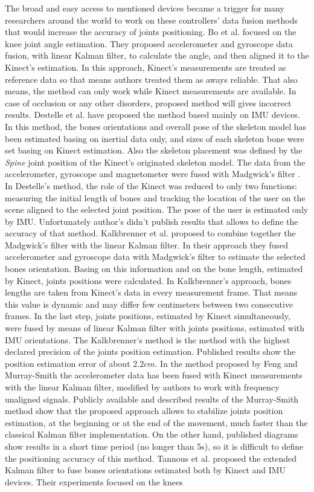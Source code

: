 \documentclass[sensors,article,submit,moreauthors,pdftex,10pt,a4paper]{mdpi}
\begin{document}
The broad and easy access to mentioned devices became a trigger for many researchers around the world to work on these controllers' data fusion methods that would increase the accuracy of joints positioning. Bo et al. \cite{Bo2011a} focused on the knee joint angle estimation. They proposed accelerometer and gyroscope data fusion, with linear Kalman filter, to calculate the angle, and then aligned it to the Kinect’s estimation. In this approach, Kinect's measurements are treated as reference data so that means authors treated them as aways reliable. That also means, the method can only work while Kinect measurements are available. In case of occlusion or any other disorders, proposed method will gives incorrect results. Destelle et al. \cite{Destelle2014} have proposed the method based mainly on IMU devices. In this method, the bones orientations and overall pose of the skeleton model has been estimated basing on inertial data only, and sizes of each skeleton bone were set basing on Kinect estimation. Also the skeleton placement was defined by the \emph{Spine} joint position of the Kinect's originated skeleton model. The data from the accelerometer, gyroscope and magnetometer were fused with Madgwick’s filter \cite{Madgwick2011}. In Destelle's method, the role of the Kinect was reduced to only two functions: measuring the initial length of bones and tracking the location of the user on the scene aligned to the selected joint position. The pose of the user is estimated only by IMU. Unfortunately author's didn't publish results that allows to define the accuracy of that method. Kalkbrenner et al. \cite{Kalkbrenner2014} proposed to combine together the Madgwick’s filter with the linear Kalman filter. In their approach they fused accelerometer and gyroscope data with Madgwick’s filter to estimate the selected bones orientation. Basing on this information and on the bone length, estimated by Kinect, joints positions were calculated. In Kalkbrenner's approach, bones lengths are taken from Kinect's data in every measurement frame. That means this value is dynamic and may differ few centimeters between two consecutive frames. In the last step, joints positions, estimated by Kinect simultaneously, were fused by means of linear Kalman filter with joints positions, estimated with IMU orientations. The Kalkbrenner's method is the method with the highest declared precision of the joints position estimation. Published results show the position estimation error of about $2.2cm$. In the method proposed by Feng and Murray-Smith \cite{Murray-Smith2014} the accelerometer data has been fused with Kinect measurements with the linear Kalman filter, modified by authors to work with frequency unaligned signals. Publicly available and described results of the Murray-Smith method show that the proposed approach allows to stabilize joints position estimation, at the beginning or at the end of the movement, much faster than the classical Kalman filter implementation. On the other hand, published diagrams show results in a short time period (no longer than 5s), so it is difficult to define the positioning accuracy of this method. Tannous et al. \cite{Tannous2016} proposed the extended Kalman filter to fuse bones orientations estimated both by Kinect and IMU devices. Their experiments focused on the knees 
\end{document}
